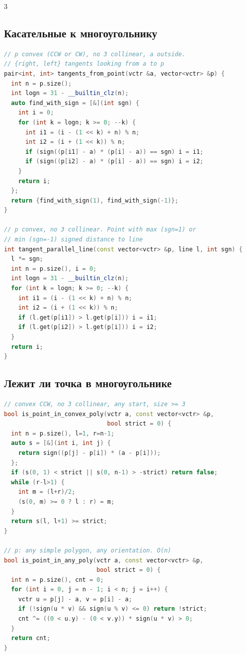 \documentclass[8pt,a4paper,landscape,twosided]{extarticle}
\begin{document}
\begin{multicols*}{3}
\subsection{Касательные к многоугольнику}
\begin{lstlisting}[language=C++]
// p convex (CCW or CW), no 3 collinear, a outside.
// {right, left} tangents looking from a to p
pair<int, int> tangents_from_point(vctr &a, vector<vctr> &p) {
  int n = p.size();
  int logn = 31 - __builtin_clz(n);
  auto find_with_sign = [&](int sgn) {
    int i = 0;
    for (int k = logn; k >= 0; --k) {
      int i1 = (i - (1 << k) + n) % n;
      int i2 = (i + (1 << k)) % n;
      if (sign((p[i1] - a) * (p[i] - a)) == sgn) i = i1;
      if (sign((p[i2] - a) * (p[i] - a)) == sgn) i = i2;
    }
    return i;
  };
  return {find_with_sign(1), find_with_sign(-1)};
}

// p convex, no 3 collinear. Point with max (sgn=1) or
// min (sgn=-1) signed distance to line
int tangent_parallel_line(const vector<vctr> &p, line l, int sgn) {
  l *= sgn;
  int n = p.size(), i = 0;
  int logn = 31 - __builtin_clz(n);
  for (int k = logn; k >= 0; --k) {
    int i1 = (i - (1 << k) + n) % n;
    int i2 = (i + (1 << k)) % n;
    if (l.get(p[i1]) > l.get(p[i])) i = i1;
    if (l.get(p[i2]) > l.get(p[i])) i = i2;
  }
  return i;
}
\end{lstlisting}

\subsection{Лежит ли точка в многоугольнике}
\begin{lstlisting}[language=C++]
// convex CCW, no 3 collinear, any start, size >= 3
bool is_point_in_convex_poly(vctr a, const vector<vctr> &p,
                             bool strict = 0) {
  int n = p.size(), l=1, r=n-1;
  auto s = [&](int i, int j) {
    return sign((p[j] - p[i]) * (a - p[i]));
  };
  if (s(0, 1) < strict || s(0, n-1) > -strict) return false;
  while (r-l>1) {
    int m = (l+r)/2;
    (s(0, m) >= 0 ? l : r) = m;
  }
  return s(l, l+1) >= strict;
}

// p: any simple polygon, any orientation. O(n)
bool is_point_in_any_poly(vctr a, const vector<vctr> &p,
                          bool strict = 0) {
  int n = p.size(), cnt = 0;
  for (int i = 0, j = n - 1; i < n; j = i++) {
    vctr u = p[j] - a, v = p[i] - a;
    if (!sign(u * v) && sign(u % v) <= 0) return !strict;
    cnt ^= ((0 < u.y) - (0 < v.y)) * sign(u * v) > 0;
  }
  return cnt;
}
\end{lstlisting}


\end{multicols*}
\end{document}
